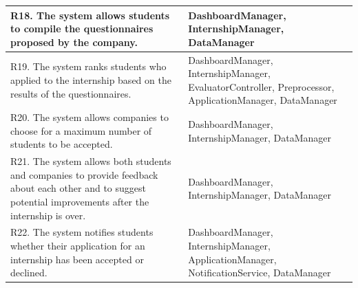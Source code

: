 \documentclass{article}
\begin{document}
\begin{table}[H]
\begin{tabular}{|p{}|p{}|}
        R18. The system allows students to compile the questionnaires proposed by
        the company.\newline
         &
        DashboardManager, \newline
        InternshipManager,\newline
        DataManager\\
        \hline

        R19. The system ranks students who applied to the internship based on the
        results of the questionnaires.\newline
         &
        DashboardManager, \newline
        InternshipManager,\newline
        EvaluatorController,\newline
        Preprocessor,\newline
        ApplicationManager, \newline
        DataManager\\

        \hline

       R20. The system allows companies to choose for a maximum number of
        students to be accepted.\newline
         &
        DashboardManager,\newline
        InternshipManager,\newline
        DataManager\\
        \hline

        R21. The system allows both students and companies to provide feedback
        about each other and to suggest potential improvements after the internship is over.\newline
         &
        DashboardManager,\newline
        InternshipManager,\newline
        DataManager\\
        \hline

        R22. The system notifies students whether their application for an internship has been accepted or declined.\newline
         &
        DashboardManager,\newline
        InternshipManager,\newline
        ApplicationManager,\newline
        NotificationService,\newline
        DataManager\\
        \hline

    \end{tabular}
\end{table}
\end{document}
